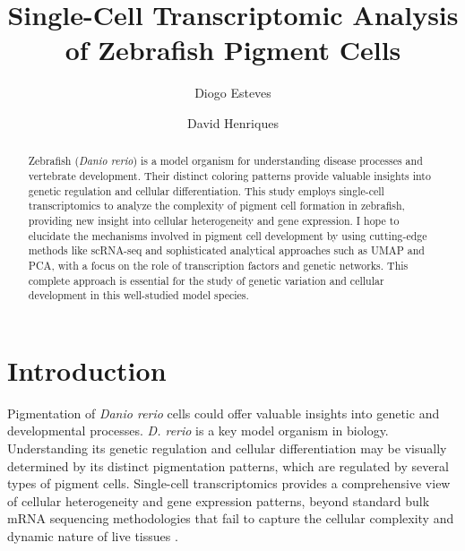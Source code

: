 \documentclass[runningheads]{llncs}
\begin{document}
\title{Single-Cell Transcriptomic Analysis of Zebrafish Pigment Cells}

\author{Diogo Esteves \and David Henriques}


\maketitle

\begin{abstract}
Zebrafish (\textit{Danio rerio}) is a model organism for understanding disease processes and vertebrate development. Their distinct coloring patterns provide valuable insights into genetic regulation and cellular differentiation. This study employs single-cell transcriptomics to analyze the complexity of pigment cell formation in zebrafish, providing new insight into cellular heterogeneity and gene expression. I hope to elucidate the mechanisms involved in pigment cell development by using cutting-edge methods like scRNA-seq and sophisticated analytical approaches such as UMAP and PCA, with a focus on the role of transcription factors and genetic networks. This complete approach is essential for the study of genetic variation and cellular development in this well-studied model species.
\end{abstract}

\section{Introduction}
\lettrine{P}{\newline}igmentation of \textit{Danio rerio} cells could offer valuable insights into genetic and developmental processes. \textit{D. rerio} is a key model organism in biology. Understanding its genetic regulation and cellular differentiation may be visually determined by its distinct pigmentation patterns, which are regulated by several types of pigment cells. Single-cell transcriptomics provides a comprehensive view of cellular heterogeneity and gene expression patterns, beyond standard bulk mRNA sequencing methodologies that fail to capture the cellular complexity and dynamic nature of live tissues \cite{kulkarni2019beyond}.
\end{document}
